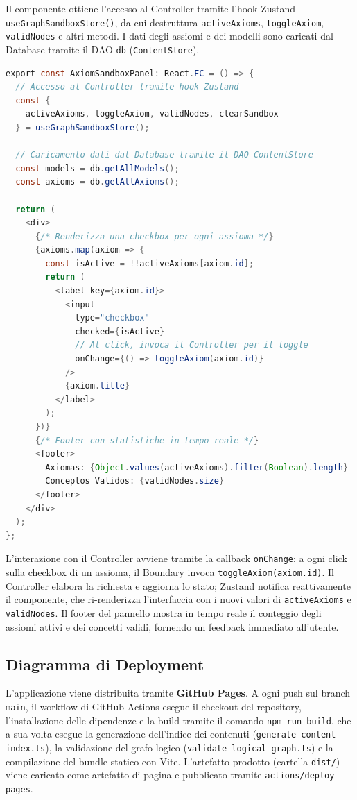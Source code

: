 \documentclass[12pt,a4paper]{article}
\begin{document}
Il componente ottiene l'accesso al Controller tramite l'hook Zustand \texttt{useGraphSandboxStore()}, da cui destruttura \texttt{activeAxioms}, \texttt{toggleAxiom}, \texttt{validNodes} e altri metodi. I dati degli assiomi e dei modelli sono caricati dal Database tramite il DAO \texttt{db} (\texttt{ContentStore}).

\begin{lstlisting}[language=Java]
export const AxiomSandboxPanel: React.FC = () => {
  // Accesso al Controller tramite hook Zustand
  const {
    activeAxioms, toggleAxiom, validNodes, clearSandbox
  } = useGraphSandboxStore();
  
  // Caricamento dati dal Database tramite il DAO ContentStore
  const models = db.getAllModels();
  const axioms = db.getAllAxioms();

  return (
    <div>
      {/* Renderizza una checkbox per ogni assioma */}
      {axioms.map(axiom => {
        const isActive = !!activeAxioms[axiom.id];
        return (
          <label key={axiom.id}>
            <input
              type="checkbox"
              checked={isActive}
              // Al click, invoca il Controller per il toggle
              onChange={() => toggleAxiom(axiom.id)}
            />
            {axiom.title}
          </label>
        );
      })}
      {/* Footer con statistiche in tempo reale */}
      <footer>
        Axiomas: {Object.values(activeAxioms).filter(Boolean).length}
        Conceptos Validos: {validNodes.size}
      </footer>
    </div>
  );
};
\end{lstlisting}

L'interazione con il Controller avviene tramite la callback \texttt{onChange}: a ogni click sulla checkbox di un assioma, il Boundary invoca \texttt{toggleAxiom(axiom.id)}. Il Controller elabora la richiesta e aggiorna lo stato; Zustand notifica reattivamente il componente, che ri-renderizza l'interfaccia con i nuovi valori di \texttt{activeAxioms} e \texttt{validNodes}. Il footer del pannello mostra in tempo reale il conteggio degli assiomi attivi e dei concetti validi, fornendo un feedback immediato all'utente.

\subsection{Diagramma di Deployment}
L'applicazione viene distribuita tramite \textbf{GitHub Pages}. A ogni push sul branch \texttt{main}, il workflow di GitHub Actions esegue il checkout del repository, l'installazione delle dipendenze e la build tramite il comando \texttt{npm run build}, che a sua volta esegue la generazione dell'indice dei contenuti (\texttt{generate-content-index.ts}), la validazione del grafo logico (\texttt{validate-logical-graph.ts}) e la compilazione del bundle statico con Vite. L'artefatto prodotto (cartella \texttt{dist/}) viene caricato come artefatto di pagina e pubblicato tramite \texttt{actions/deploy-pages}.
\end{document}
